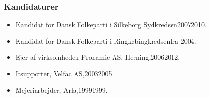 \documentclass[11pt, a4paper]{awesome-cv}
\begin{document}
\begin{cvletter}
\subsubsection*{Kandidaturer}
\begin{itemize}
\item Kandidat for Dansk Folkeparti i Silkeborg Sydkredsen20072010.
\item Kandidat for Dansk Folkeparti i Ringkøbingkredsenfra 2004.
\end{itemize}
\begin{itemize}
\item Ejer af virksomheden Pronamic AS, Herning,20062012.
\item Itsupporter, Velfac AS,20032005.
\item Mejeriarbejder, Arla,19991999.
\end{itemize}
\end{cvletter}
\end{document}
